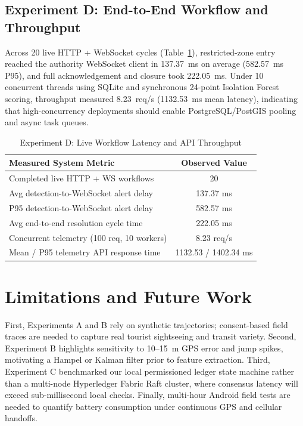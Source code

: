 \documentclass[conference]{IEEEtran}
\begin{document}
\subsection{Experiment D: End-to-End Workflow and Throughput}
Across 20 live HTTP + WebSocket cycles (Table~\ref{tab:exp_d}), restricted-zone entry reached the authority WebSocket client in 137.37~ms on average (582.57~ms P95), and full acknowledgement and closure took 222.05~ms. Under 10 concurrent threads using SQLite and synchronous 24-point Isolation Forest scoring, throughput measured 8.23~req/s (1132.53~ms mean latency), indicating that high-concurrency deployments should enable PostgreSQL/PostGIS pooling and async task queues.

\begin{table}[t]
\centering
\caption{Experiment D: Live Workflow Latency and API Throughput}
\label{tab:exp_d}
\scriptsize
\begin{tabular}{@{}lc@{}}
\toprule
\textbf{Measured System Metric} & \textbf{Observed Value} \\
\midrule
Completed live HTTP + WS workflows & 20 \\
Avg detection-to-WebSocket alert delay & 137.37 ms \\
P95 detection-to-WebSocket alert delay & 582.57 ms \\
Avg end-to-end resolution cycle time & 222.05 ms \\
Concurrent telemetry (100 req, 10 workers) & 8.23 req/s \\
Mean / P95 telemetry API response time & 1132.53 / 1402.34 ms \\
\bottomrule
\end{tabular}
\end{table}

\section{Limitations and Future Work}
First, Experiments A and B rely on synthetic trajectories; consent-based field traces are needed to capture real tourist sightseeing and transit variety. Second, Experiment B highlights sensitivity to 10--15~m GPS error and jump spikes, motivating a Hampel or Kalman filter prior to feature extraction. Third, Experiment C benchmarked our local permissioned ledger state machine rather than a multi-node Hyperledger Fabric Raft cluster, where consensus latency will exceed sub-millisecond local checks. Finally, multi-hour Android field tests are needed to quantify battery consumption under continuous GPS and cellular handoffs.
\end{document}
